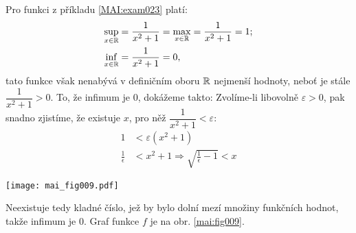 \wikitextrule
\begin{example}\label{MAI:exam021} 
  Pro funkci z příkladu \ref{MAI:exam023} platí:
  \begin{align*}
    \sup_{x\in\mathbb{R}}&=\frac{1}{x^2+1}=\max_{x\in\mathbb{R}}=\frac{1}{x^2+1}=1;   \\
    \inf_{x\in\mathbb{R}}&=\frac{1}{x^2+1}=0,
  \end{align*}
  tato funkce však nenabývá v definičním oboru $\mathbb{R}$ nejmenší hodnoty, neboť je stále 
  $\dfrac{1}{x^2+1}>0$. To, že infimum je $0$, dokážeme takto: Zvolíme-li libovolně 
  $\varepsilon>0$, pak snadno zjistíme, že existuje $x$, pro něž 
  $\dfrac{1}{x^2+1}<\varepsilon$:
  \begin{align*}
    1                  &< \varepsilon(x^2+1) \\
    \frac{1}{\epsilon} &< x^2+1 \Rightarrow \sqrt{\frac{1}{\epsilon}-1} < x
  \end{align*} 
  
  {\centering
   \captionsetup{type=figure}
%   
   \texttt{[image: mai\_fig009.pdf]}
   \label{mai:fig009}
  \par}
  
  Neexistuje tedy kladné číslo, jež by bylo dolní mezí množiny funkčních hodnot, takže infimum je 
  $0$. Graf funkce $f$ je na obr. \ref{mai:fig009}.
\end{example}